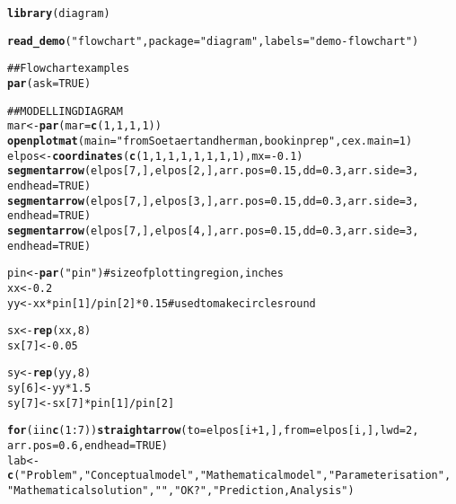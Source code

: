 \documentclass{article}\usepackage{graphicx, color}
\makeatletter
\newcommand{\hlfunctioncall}[1]{\textcolor[rgb]{0.501960784313725,0,0.329411764705882}{\textbf{#1}}}%
\newcommand{\hlstring}[1]{\textcolor[rgb]{0.6,0.6,1}{#1}}%
\newcommand{\hlcomment}[1]{\textcolor[rgb]{0.180392156862745,0.6,0.341176470588235}{#1}}%
\newenvironment{kframe}{%
 \def\at@end@of@kframe{}%
 \ifinner\ifhmode%
  \def\at@end@of@kframe{\end{minipage}}%
  \begin{minipage}{\columnwidth}%
 \fi\fi%
 \def\FrameCommand##1{\hskip\@totalleftmargin \hskip-\fboxsep
 \colorbox{shadecolor}{##1}\hskip-\fboxsep
     \hskip-\linewidth \hskip-\@totalleftmargin \hskip\columnwidth}%
 \MakeFramed {\advance\hsize-\width
   \@totalleftmargin\z@ \linewidth\hsize
   \@setminipage}}%
 {\par\unskip\endMakeFramed%
 \at@end@of@kframe}
\newenvironment{knitrout}{}{} %
\makeatother
\begin{document}
\begin{knitrout}
\color{fgcolor}\begin{kframe}
\begin{alltt}
\hlfunctioncall{library}(diagram)
\end{alltt}


{\ttfamily\noindent\itshape\color{messagecolor}{\#\# Loading required package: shape}}\begin{alltt}
\hlfunctioncall{read_demo}(\hlstring{"flowchart"}, package = \hlstring{"diagram"}, labels = \hlstring{"demo-flowchart"})
\end{alltt}
\end{kframe}
\end{knitrout}
\begin{knitrout}
\color{fgcolor}\begin{kframe}
\begin{alltt}
\hlcomment{## Flowchart examples}
\hlfunctioncall{par}(ask = TRUE)

\hlcomment{## MODELLING DIAGRAM}
mar <- \hlfunctioncall{par}(mar = \hlfunctioncall{c}(1, 1, 1, 1))
\hlfunctioncall{openplotmat}(main = \hlstring{"from Soetaert and herman, book in prep"}, cex.main = 1)
elpos <- \hlfunctioncall{coordinates}(\hlfunctioncall{c}(1, 1, 1, 1, 1, 1, 1, 1), mx = -0.1)
\hlfunctioncall{segmentarrow}(elpos[7, ], elpos[2, ], arr.pos = 0.15, dd = 0.3, arr.side = 3, 
    endhead = TRUE)
\hlfunctioncall{segmentarrow}(elpos[7, ], elpos[3, ], arr.pos = 0.15, dd = 0.3, arr.side = 3, 
    endhead = TRUE)
\hlfunctioncall{segmentarrow}(elpos[7, ], elpos[4, ], arr.pos = 0.15, dd = 0.3, arr.side = 3, 
    endhead = TRUE)

pin <- \hlfunctioncall{par}(\hlstring{"pin"})  # size of plotting region, inches
xx <- 0.2
yy <- xx * pin[1]/pin[2] * 0.15  \hlcomment{# used to make circles round}

sx <- \hlfunctioncall{rep}(xx, 8)
sx[7] <- 0.05

sy <- \hlfunctioncall{rep}(yy, 8)
sy[6] <- yy * 1.5
sy[7] <- sx[7] * pin[1]/pin[2]

\hlfunctioncall{for} (i in \hlfunctioncall{c}(1:7)) \hlfunctioncall{straightarrow}(to = elpos[i + 1, ], from = elpos[i, ], lwd = 2, 
    arr.pos = 0.6, endhead = TRUE)
lab <- \hlfunctioncall{c}(\hlstring{"Problem"}, \hlstring{"Conceptual model"}, \hlstring{"Mathematical model"}, \hlstring{"Parameterisation"}, 
    \hlstring{"Mathematical solution"}, \hlstring{""}, \hlstring{"OK?"}, \hlstring{"Prediction, Analysis"})


\end{alltt}
\end{kframe}
\end{knitrout}
\end{document}
